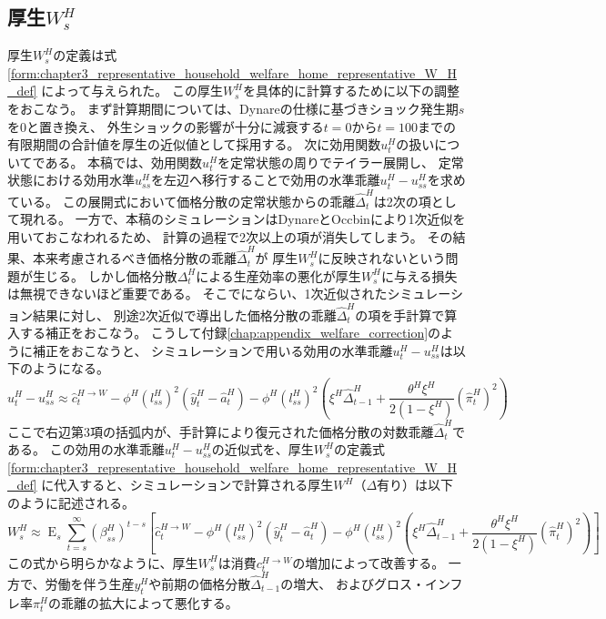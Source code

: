 \subsection{厚生\(W_s^H\)}
\label{sec:chapter5_welfare}
厚生\(W_s^H\)の定義は式
\eqref{form:chapter3_representative_household_welfare_home_representative_W_H_def}
によって与えられた。
この厚生\(W_s^H\)を具体的に計算するために以下の調整をおこなう。
まず計算期間については、Dynareの仕様に基づきショック発生期\(s\)を0と置き換え、
外生ショックの影響が十分に減衰する\(t=0\)から\(t=100\)までの有限期間の合計値を厚生の近似値として採用する。
次に効用関数\(u_t^H\)の扱いについてである。
本稿では、効用関数\(u_t^H\)を定常状態の周りでテイラー展開し、
定常状態における効用水準\(u_{ss}^H\)を左辺へ移行することで効用の水準乖離\(u_t^H-u_{ss}^H\)を求めている。
この展開式において価格分散の定常状態からの乖離\(\hat{\Delta}_t^H\)は2次の項として現れる。
一方で、本稿のシミュレーションはDynareとOccbinにより1次近似を用いておこなわれるため、
計算の過程で2次以上の項が消失してしまう。
その結果、本来考慮されるべき価格分散の乖離\(\hat{\Delta}_t^H\)が
厚生\(W_s^H\)に反映されないという問題が生じる。
しかし価格分散\(\Delta_t^H\)による生産効率の悪化が厚生\(W_s^H\)に与える損失は無視できないほど重要である。
そこで\textcite{Woodford2003}にならい、1次近似されたシミュレーション結果に対し、
別途2次近似で導出した価格分散の乖離\(\hat{\Delta}_t^H\)の項を手計算で算入する補正をおこなう。
こうして付録\ref{chap:appendix_welfare_correction}のように補正をおこなうと、
シミュレーションで用いる効用の水準乖離\(u_t^H-u_{ss}^H\)は以下のようになる。
\begin{equation}
\label{form:chapter5_welfare_u_H_minus_u_H_ss_eq}
    u_t^H-u_{ss}^H\approx\hat{c}_t^{H\to W}-\phi^H(l_{ss}^H)^2(\hat{y}_t^H-\hat{a}_t^H)-\phi^H(l_{ss}^H)^2\left(\xi^H\hat{\Delta}_{t-1}^H+\frac{\theta^H\xi^H}{2(1-\xi^H)}(\hat{\pi}_t^H)^2\right)
\end{equation}
ここで右辺第3項の括弧内が、手計算により復元された価格分散の対数乖離\(\hat{\Delta}_t^H\)である。
この効用の水準乖離\(u_t^H-u_{ss}^H\)の近似式を、厚生\(W_s^H\)の定義式
\eqref{form:chapter3_representative_household_welfare_home_representative_W_H_def}
に代入すると、シミュレーションで計算される厚生\(W^H\)（\(\Delta\)有り）は以下のように記述される。
\begin{equation}
\label{form:chapter5_welfare_W_H_eq}
W_s^H\approx\operatorname{E}_s\sum_{t=s}^{\infty}(\beta_{ss}^H)^{t-s}\left[\hat{c}_t^{H\to W}-\phi^H(l_{ss}^H)^2(\hat{y}_t^H-\hat{a}_t^H)-\phi^H(l_{ss}^H)^2\left(\xi^H\hat{\Delta}_{t-1}^H+\frac{\theta^H\xi^H}{2(1-\xi^H)}(\hat{\pi}_t^H)^2\right)\right]
\end{equation}
この式から明らかなように、厚生\(W_s^H\)は消費\(c_t^{H\to W}\)の増加によって改善する。
一方で、労働を伴う生産\(y_t^H\)や前期の価格分散\(\hat{\Delta}_{t-1}^H\)の増大、
およびグロス・インフレ率\(\pi_t^H\)の乖離の拡大によって悪化する。